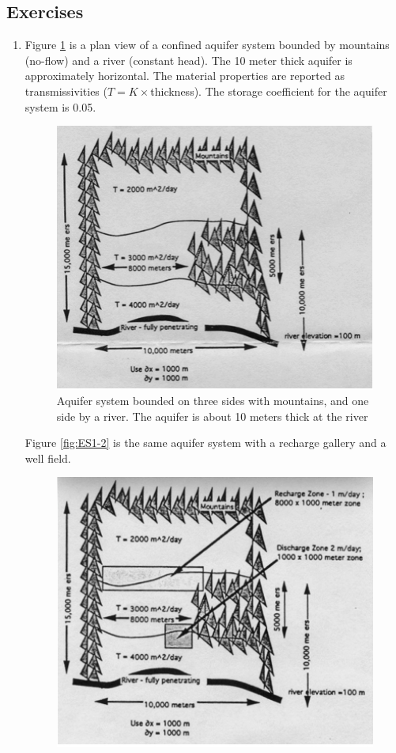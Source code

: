 \subsection{Exercises}
\begin{enumerate}
\item Figure \ref{fig:ES1-1} is a plan view of a confined aquifer system bounded by mountains (no-flow) and a river (constant head).
The 10 meter thick aquifer is approximately horizontal. 
The material properties are reported as transmissivities ($T = K \times$thickness).
The storage coefficient for the aquifer system is 0.05.
\begin{figure}[h!] %
   \centering
   \includegraphics[width=5in]{./18-UnsteadyGroundwaterFlow/EX1-1.jpg} 
   \caption{Aquifer system bounded on three sides with mountains, and one side by a river.  The aquifer is about 10 meters thick at the river}
   \label{fig:ES1-1}
\end{figure}
Figure \ref{fig:ES1-2} is the same aquifer system with a recharge gallery and a well field. 
\begin{figure}[h!] %
   \centering
   \includegraphics[width=5in]{./18-UnsteadyGroundwaterFlow/EX1-2.jpg} 

\end{figure}
\end{enumerate}
